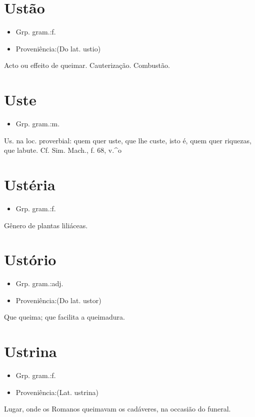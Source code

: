 \documentclass{article}
\begin{document}
\section{Ustão}
\begin{itemize}
\item {Grp. gram.:f.}
\end{itemize}
\begin{itemize}
\item {Proveniência:(Do lat. \textunderscore ustio\textunderscore )}
\end{itemize}
Acto ou effeito de queimar.
Cauterização.
Combustão.
\section{Uste}
\begin{itemize}
\item {Grp. gram.:m.}
\end{itemize}
Us. na loc. proverbial: \textunderscore quem quer uste, que lhe custe\textunderscore , isto é, quem quer riquezas, que labute. Cf. Sim. Mach., f. 68, v.^o
\section{Ustéria}
\begin{itemize}
\item {Grp. gram.:f.}
\end{itemize}
Gênero de plantas liliáceas.
\section{Ustório}
\begin{itemize}
\item {Grp. gram.:adj.}
\end{itemize}
\begin{itemize}
\item {Proveniência:(Do lat. \textunderscore ustor\textunderscore )}
\end{itemize}
Que queima; que facilita a queimadura.
\section{Ustrina}
\begin{itemize}
\item {Grp. gram.:f.}
\end{itemize}
\begin{itemize}
\item {Proveniência:(Lat. \textunderscore ustrina\textunderscore )}
\end{itemize}
Lugar, onde os Romanos queimavam os cadáveres, na occasião do funeral.
\end{document}
